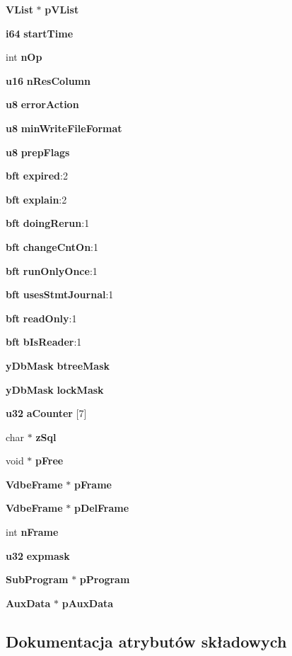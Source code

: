 \begin{DoxyCompactItemize}
\textbf{ V\+List} $\ast$ \textbf{ p\+V\+List}
\item 
\textbf{ i64} \textbf{ start\+Time}
\item 
int \textbf{ n\+Op}
\item 
\textbf{ u16} \textbf{ n\+Res\+Column}
\item 
\textbf{ u8} \textbf{ error\+Action}
\item 
\textbf{ u8} \textbf{ min\+Write\+File\+Format}
\item 
\textbf{ u8} \textbf{ prep\+Flags}
\item 
\textbf{ bft} \textbf{ expired}\+:2
\item 
\textbf{ bft} \textbf{ explain}\+:2
\item 
\textbf{ bft} \textbf{ doing\+Rerun}\+:1
\item 
\textbf{ bft} \textbf{ change\+Cnt\+On}\+:1
\item 
\textbf{ bft} \textbf{ run\+Only\+Once}\+:1
\item 
\textbf{ bft} \textbf{ uses\+Stmt\+Journal}\+:1
\item 
\textbf{ bft} \textbf{ read\+Only}\+:1
\item 
\textbf{ bft} \textbf{ b\+Is\+Reader}\+:1
\item 
\textbf{ y\+Db\+Mask} \textbf{ btree\+Mask}
\item 
\textbf{ y\+Db\+Mask} \textbf{ lock\+Mask}
\item 
\textbf{ u32} \textbf{ a\+Counter} [7]
\item 
char $\ast$ \textbf{ z\+Sql}
\item 
void $\ast$ \textbf{ p\+Free}
\item 
\textbf{ Vdbe\+Frame} $\ast$ \textbf{ p\+Frame}
\item 
\textbf{ Vdbe\+Frame} $\ast$ \textbf{ p\+Del\+Frame}
\item 
int \textbf{ n\+Frame}
\item 
\textbf{ u32} \textbf{ expmask}
\item 
\textbf{ Sub\+Program} $\ast$ \textbf{ p\+Program}
\item 
\textbf{ Aux\+Data} $\ast$ \textbf{ p\+Aux\+Data}
\end{DoxyCompactItemize}


\subsection{Dokumentacja atrybutów składowych}
\mbox{\label{struct_vdbe_a900f557143e7d2ab8c560f7ada66d0f7}} 
